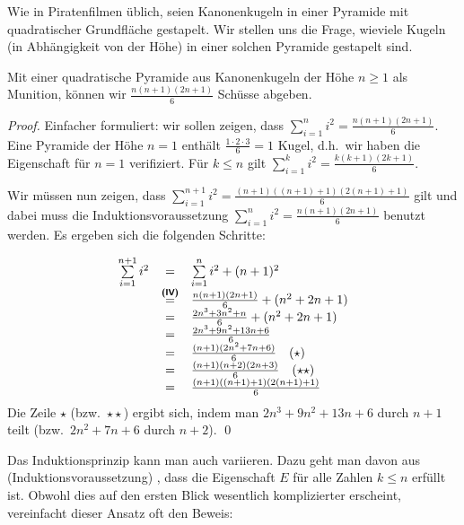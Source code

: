 Wie in Piratenfilmen üblich, seien Kanonenkugeln in einer Pyramide mit
quadratischer Grundfläche gestapelt. Wir stellen uns die Frage,
wieviele Kugeln (in Abhängigkeit von der Höhe) in einer solchen
Pyramide gestapelt sind.

\begin{theorem}
\label{Pyramid}
Mit einer quadratische Pyramide aus Kanonenkugeln der Höhe $n \ge 1$
als Munition, können wir $\frac{n(n+1)(2n+1)}{6}$ Schüsse abgeben.
\end{theorem}

\goodbreak
\begin{proof}
Einfacher formuliert: wir sollen zeigen, dass $\sum\limits_{i=1}^n i^2 =
\frac{n(n+1)(2n+1)}{6}$.
\induproof%
{Eine Pyramide der Höhe $n = 1$ enthält $\frac{1 \cdot 2 \cdot 3}{6} =
  1$ Kugel, d.h.~wir haben die Eigenschaft für $n = 1$ verifiziert.}%
{Für $k \le n$ gilt $\sum\limits_{i=1}^k i^2 = \frac{k(k+1)(2k+1)}{6}$.}%
{%
Wir müssen nun zeigen, dass $\sum\limits_{i=1}^{n+1} i^2 =
\frac{(n+1)((n+1)+1)(2(n+1)+1)}{6}$ gilt und dabei muss die
Induktionsvoraussetzung $\sum\limits_{i=1}^n i^2 = \frac{n(n+1)(2n+1)}{6}$
benutzt werden. Es ergeben sich die folgenden Schritte: 

\begin{displaymath}
\begin{array}{rcl}
\sum\limits_{i=1}^{n+1}i^2 &=& \sum\limits_{i=1}^{n}i^2 + (n + 1)^2\\
&\stackrel{\text{\textbf{\textsf{(IV)}}}}{=}& \frac{n(n+1)(2n+1)}{6} +
(n^2 + 2n + 1)\\
&=& \frac{2n^3 + 3n^2+n}{6} + (n^2 + 2n + 1)\\
&=& \frac{2n^3 + 9n^2+13n + 6}{6}\\
&=& \frac{(n+1)(2n^2+7n+6)}{6} \quad (\star)\\
&=& \frac{(n+1)(n+2)(2n+3)}{6} \quad (\star\star)\\
&=& \frac{(n+1)((n+1) + 1)(2(n + 1) + 1)}{6}\\
\end{array}
\end{displaymath}
Die Zeile $\star$ (bzw.~$\star\star$) ergibt sich, indem man $2n^3 +
9n^2+13n + 6$ durch $n+1$ teilt (bzw.~$2n^2+7n+6$ durch $n+2$). \qed
}
\end{proof}
\smallskip

\noindent Das Induktionsprinzip kann man auch variieren. Dazu geht man davon 
aus (Induktionsvoraussetzung) , dass die Eigenschaft $E$ für alle Zahlen $k \le n$ 
erfüllt ist. Obwohl dies auf den ersten Blick wesentlich 
komplizierter erscheint, vereinfacht dieser Ansatz oft den Beweis:

